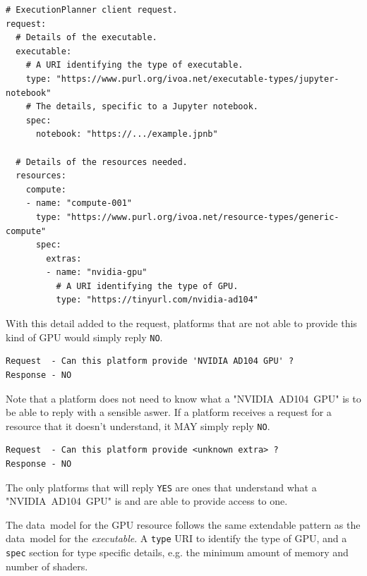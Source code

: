 \documentclass[11pt,a4paper]{ivoa}
\newcommand{\datamodel} {data~model}
\newcommand{\codeword}[1] {\texttt{#1}}
\newcommand{\executable} {\textit{executable}}
\newcommand{\gpu} {GPU}
\newcommand{\nvidiagpu} {NVIDIA~AD104~GPU}
\begin{document}
\begin{lstlisting}[]
# ExecutionPlanner client request.
request:
  # Details of the executable.
  executable:
    # A URI identifying the type of executable.
    type: "https://www.purl.org/ivoa.net/executable-types/jupyter-notebook"
    # The details, specific to a Jupyter notebook.
    spec:
      notebook: "https://.../example.jpnb"

  # Details of the resources needed.
  resources:
    compute:
    - name: "compute-001"
      type: "https://www.purl.org/ivoa.net/resource-types/generic-compute"
      spec:
        extras:
        - name: "nvidia-gpu"
          # A URI identifying the type of GPU.
          type: "https://tinyurl.com/nvidia-ad104"
\end{lstlisting}

With this detail added to the request, platforms that are not able to provide this kind of \gpu{}
would simply reply \codeword{NO}.

\begin{lstlisting}[]
Request  - Can this platform provide 'NVIDIA AD104 GPU' ?
Response - NO
\end{lstlisting}

Note that a platform does not need to know what a  "\nvidiagpu{}" is to be able to reply with a sensible aswer.
If a platform receives a request for a resource that it doesn't understand, it MAY simply reply \codeword{NO}.

\begin{lstlisting}[]
Request  - Can this platform provide <unknown extra> ?
Response - NO
\end{lstlisting}

The only platforms that will reply \codeword{YES} are ones that understand what a "\nvidiagpu{}"
is and are able to provide access to one.

The \datamodel{} for the \gpu{} resource follows the same extendable pattern as the \datamodel{} for
the \executable{}. A \codeword{type} URI to identify the type of \gpu{},
and a \codeword{spec} section for type specific details,
e.g. the minimum amount of memory and number of shaders.
\end{document}
